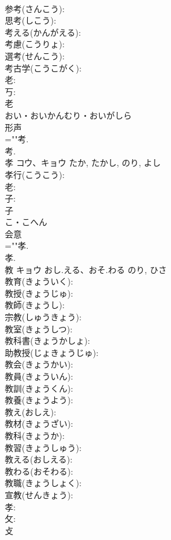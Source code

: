 \documentclass[8pt]{extreport}
\begin{document}
\begin{CJK}{UTF8}{min}
\\	参考(さんこう): 
\\	思考(しこう): 
\\	考える(かんがえる): 
\\	考慮(こうりょ): 
\\	選考(せんこう): 
\\	考古学(こうこがく): 
\\	老: 
\\	丂: 
\\	老	
\\	おい・おいかんむり・おいがしら	
\\	形声 
\\	=""考.
\\	考.
\\	孝	コウ、キョウ		たか, たかし, のり, よし	
\\	孝行(こうこう): 
\\	老: 
\\	子: 
\\	子	
\\	こ・こへん	
\\	会意 
\\	=""孝.
\\	孝.
\\	教	キョウ	おし.える、おそ.わる	のり, ひさ	
\\	教育(きょういく): 
\\	教授(きょうじゅ): 
\\	教師(きょうし): 
\\	宗教(しゅうきょう): 
\\	教室(きょうしつ): 
\\	教科書(きょうかしょ): 
\\	助教授(じょきょうじゅ): 
\\	教会(きょうかい): 
\\	教員(きょういん): 
\\	教訓(きょうくん): 
\\	教養(きょうよう): 
\\	教え(おしえ): 
\\	教材(きょうざい): 
\\	教科(きょうか): 
\\	教習(きょうしゅう): 
\\	教える(おしえる): 
\\	教わる(おそわる): 
\\	教職(きょうしょく): 
\\	宣教(せんきょう): 
\\	孝: 
\\	攵: 
\\	攴	

\end{CJK}
\end{document}
